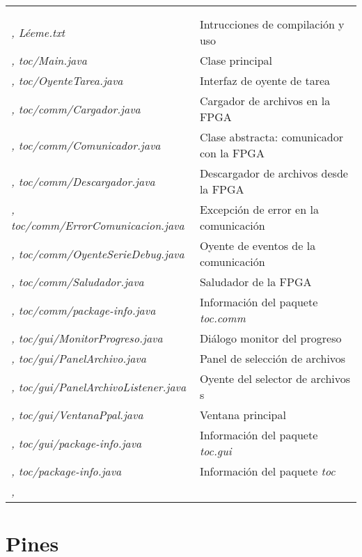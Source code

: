 \documentclass{article}
\begin{document}
\begin{tabu}{| >{\itshape}X[3, l] | X[5, l] |}
	 \\
	 \\ \sep
	Léeme.txt & Intrucciones de compilación y uso \\ \sep
	toc/Main.java & Clase principal \\ \sep
	toc/OyenteTarea.java & Interfaz de oyente de tarea \\ \sep
	toc/comm/Cargador.java & Cargador de archivos en la FPGA \\ \sep
	toc/comm/Comunicador.java & Clase abstracta: comunicador con la FPGA \\ \sep
	toc/comm/Descargador.java & Descargador de archivos desde la FPGA \\ \sep
	toc/comm/ErrorComunicacion.java & Excepción de error en la comunicación \\ \sep
	toc/comm/OyenteSerieDebug.java & Oyente de eventos de la comunicación \\ \sep
	toc/comm/Saludador.java & Saludador de la FPGA \\ \sep
	toc/comm/package-info.java & Información del paquete {\itshape toc.comm} \\ \sep
	toc/gui/MonitorProgreso.java & Diálogo monitor del progreso \\ \sep
	toc/gui/PanelArchivo.java & Panel de selección de archivos \\ \sep
	toc/gui/PanelArchivoListener.java & Oyente del selector de archivos s\\ \sep
	toc/gui/VentanaPpal.java & Ventana principal \\ \sep
	toc/gui/package-info.java & Información del paquete {\itshape toc.gui} \\ \sep
	toc/package-info.java & Información del paquete {\itshape toc} \\ \sep
\end{tabu}

\section{Pines}
\end{document}
